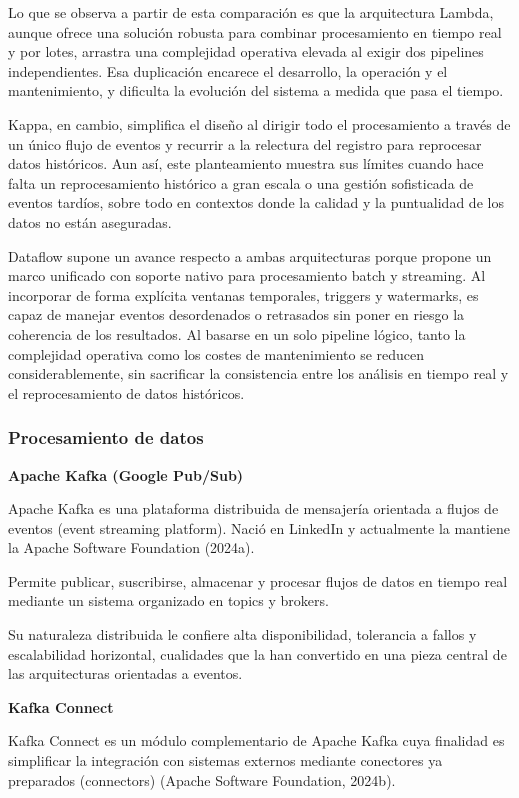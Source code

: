 \documentclass[12pt,a4paper]{article}
\begin{document}
Lo que se observa a partir de esta comparación es que la arquitectura Lambda, aunque ofrece una solución robusta para combinar procesamiento en tiempo real y por lotes, arrastra una complejidad operativa elevada al exigir dos pipelines independientes. Esa duplicación encarece el desarrollo, la operación y el mantenimiento, y dificulta la evolución del sistema a medida que pasa el tiempo.

Kappa, en cambio, simplifica el diseño al dirigir todo el procesamiento a través de un único flujo de eventos y recurrir a la relectura del registro para reprocesar datos históricos. Aun así, este planteamiento muestra sus límites cuando hace falta un reprocesamiento histórico a gran escala o una gestión sofisticada de eventos tardíos, sobre todo en contextos donde la calidad y la puntualidad de los datos no están aseguradas.

Dataflow supone un avance respecto a ambas arquitecturas porque propone un marco unificado con soporte nativo para procesamiento batch y streaming. Al incorporar de forma explícita ventanas temporales, triggers y watermarks, es capaz de manejar eventos desordenados o retrasados sin poner en riesgo la coherencia de los resultados. Al basarse en un solo pipeline lógico, tanto la complejidad operativa como los costes de mantenimiento se reducen considerablemente, sin sacrificar la consistencia entre los análisis en tiempo real y el reprocesamiento de datos históricos.


\subsubsection{Procesamiento de datos}

\textbf{Apache Kafka (Google Pub/Sub)}

Apache Kafka es una plataforma distribuida de mensajería orientada a flujos de eventos (event streaming platform). Nació en LinkedIn y actualmente la mantiene la Apache Software Foundation (2024a).

Permite publicar, suscribirse, almacenar y procesar flujos de datos en tiempo real mediante un sistema organizado en topics y brokers.

Su naturaleza distribuida le confiere alta disponibilidad, tolerancia a fallos y escalabilidad horizontal, cualidades que la han convertido en una pieza central de las arquitecturas orientadas a eventos.

\textbf{Kafka Connect}

Kafka Connect es un módulo complementario de Apache Kafka cuya finalidad es simplificar la integración con sistemas externos mediante conectores ya preparados (connectors) (Apache Software Foundation, 2024b).
\end{document}
